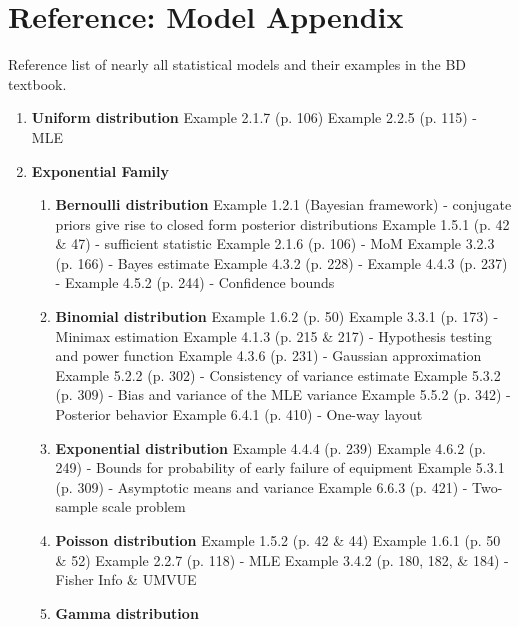 \section{Reference: Model Appendix}
  \label{sec:modelappendix}
  	Reference list of nearly all statistical models and their examples in the BD textbook.

  	\begin{enumerate}[label*=\textbf{\arabic*.}]
  		\item \textbf{Uniform distribution}
  			\subitem Example 2.1.7 (p. 106)
  			\subitem Example 2.2.5 (p. 115) - MLE
  		\item \textbf{Exponential Family}
  			\begin{enumerate}[label*=\textbf{\arabic*.}]
  				\item \textbf{Bernoulli distribution}
  					\subitem Example 1.2.1 (Bayesian framework) - conjugate priors give rise to closed form posterior distributions
  					\subitem Example 1.5.1 (p. 42 \& 47) - sufficient statistic
  					\subitem Example 2.1.6 (p. 106) - MoM
  					\subitem Example 3.2.3 (p. 166) - Bayes estimate
  					\subitem Example 4.3.2 (p. 228) - 
  					\subitem Example 4.4.3 (p. 237) - 
  					\subitem Example 4.5.2 (p. 244) - Confidence bounds
  				\item \textbf{Binomial distribution}
  					\subitem Example 1.6.2 (p. 50)
  					\subitem Example 3.3.1 (p. 173) - Minimax estimation
  					\subitem Example 4.1.3 (p. 215 \& 217) - Hypothesis testing and power function
  					\subitem Example 4.3.6 (p. 231) - Gaussian approximation
  					\subitem Example 5.2.2 (p. 302) - Consistency of variance estimate
  					\subitem Example 5.3.2 (p. 309) - Bias and variance of the MLE variance
  					\subitem Example 5.5.2 (p. 342) - Posterior behavior
  					\subitem Example 6.4.1 (p. 410) - One-way layout
  				\item \textbf{Exponential distribution}
  					\subitem Example 4.4.4 (p. 239)
  					\subitem Example 4.6.2 (p. 249) - Bounds for probability of early failure of equipment
  					\subitem Example 5.3.1 (p. 309) - Asymptotic means and variance
  					\subitem Example 6.6.3 (p. 421) - Two-sample scale problem
  				\item \textbf{Poisson distribution}
  					\subitem Example 1.5.2 (p. 42 \& 44)
  					\subitem Example 1.6.1 (p. 50 \& 52)
  					\subitem Example 2.2.7 (p. 118) - MLE
  					\subitem Example 3.4.2 (p. 180, 182, \& 184) - Fisher Info \& UMVUE
  				\item \textbf{Gamma distribution}

\end{enumerate}
\end{enumerate}
